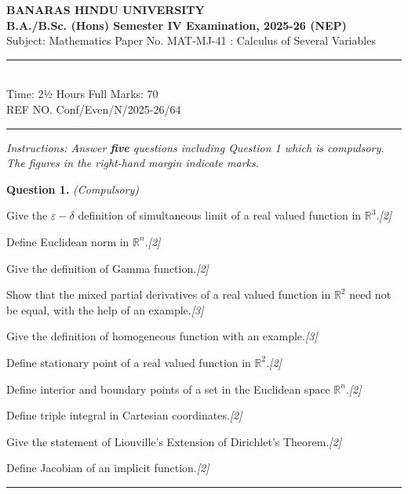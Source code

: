 \documentclass[11pt,a4paper]{article}
\newcommand{\pts}[1]{\hfill   \textit{[#1]}}
\begin{document}
\begin{center}
  {\large\bfseries BANARAS HINDU UNIVERSITY}\\[2pt]
  {\large\bfseries B.A./B.Sc. (Hons) Semester IV Examination, 2025-26 (NEP)}\\[4pt]
  {\normalsize Subject: Mathematics \hfill Paper No. MAT-MJ-41 : Calculus of Several Variables}\\[4pt]
  \rule{0.8\linewidth}{0.5pt}\\[6pt]
  {\normalsize Time: 2½ Hours \hfill Full Marks: 70}\\[2pt]
  {\small REF NO. Conf/Even/N/2025-26/64}
\end{center}
\rule{\linewidth}{0.4pt}
\smallskip



\noindent   \textit{Instructions: Answer   \textbf{five} questions including Question 1 which is compulsory. The figures in the right-hand margin indicate marks.}
\bigskip




\noindent   \textbf{Question 1.}   \textit{(Compulsory)}

\begin{parts}
  \item Give the $\varepsilon - \delta$ definition of simultaneous limit of a real valued function in $\mathbb{R}^3$.\pts{2}
  \item Define Euclidean norm in $\mathbb{R}^n$.\pts{2}
  \item Give the definition of Gamma function.\pts{2}
  \item Show that the mixed partial derivatives of a real valued function in $\mathbb{R}^2$ need not be equal, with the help of an example.\pts{3}
  \item Give the definition of homogeneous function with an example.\pts{3}
  \item Define stationary point of a real valued function in $\mathbb{R}^2$.\pts{2}
  \item Define interior and boundary points of a set in the Euclidean space $\mathbb{R}^n$.\pts{2}
  \item Define triple integral in Cartesian coordinates.\pts{2}
  \item Give the statement of Liouville's Extension of Dirichlet's Theorem.\pts{2}
  \item Define Jacobian of an implicit function.\pts{2}
\end{parts}
\medskip\rule{\linewidth}{0.2pt}

\medskip
\end{document}
